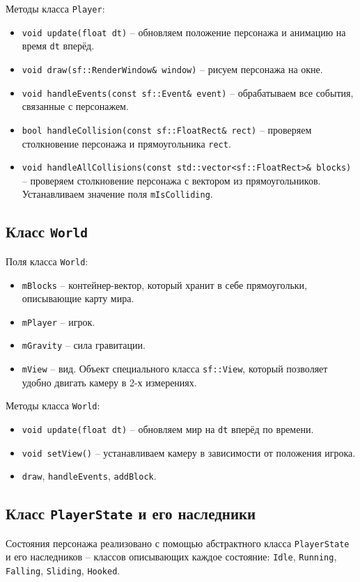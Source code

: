 \documentclass{article}
\begin{document}
\begin{itemize}
Методы класса \texttt{Player}:
\begin{itemize}
\item \texttt{void update(float dt)} -- обновляем положение персонажа и анимацию на время \texttt{dt} вперёд.
\item \texttt{void draw(sf::RenderWindow\& window)} -- рисуем персонажа на окне.
\item \texttt{void handleEvents(const sf::Event\& event)} -- обрабатываем все события, связанные с персонажем.
\item \texttt{bool handleCollision(const sf::FloatRect\& rect)} -- проверяем столкновение персонажа и прямоугольника \texttt{rect}.
\item \texttt{void handleAllCollisions(const std::vector<sf::FloatRect>\& blocks)} -- проверяем столкновение персонажа с вектором из прямоугольников. Устанавливаем значение поля \texttt{mIsColliding}.
\end{itemize}


\subsection*{Класс \texttt{World}}
Поля класса \texttt{World}:
\begin{itemize}
\item \texttt{mBlocks} -- контейнер-вектор, который хранит в себе прямоугольки, описывающие карту мира.
\item \texttt{mPlayer} -- игрок.
\item \texttt{mGravity} -- сила гравитации.
\item \texttt{mView} -- вид. Объект специального класса \texttt{sf::View}, который позволяет удобно двигать камеру в 2-х измерениях.
\end{itemize}

Методы класса \texttt{World}:
\begin{itemize}
\item \texttt{void update(float dt)} -- обновляем мир на \texttt{dt} вперёд по времени.
\item \texttt{void setView()} -- устанавливаем камеру в зависимости от положения игрока.
\item \texttt{draw}, \texttt{handleEvents}, \texttt{addBlock}.

\end{itemize}
\newpage
\subsection*{Класс \texttt{PlayerState} и его наследники}
Состояния персонажа реализовано с помощью абстрактного класса \texttt{PlayerState} и его наследников -- классов описывающих каждое состояние: \texttt{Idle}, \texttt{Running}, \texttt{Falling}, \texttt{Sliding}, \texttt{Hooked}.


\end{itemize}
\end{document}
